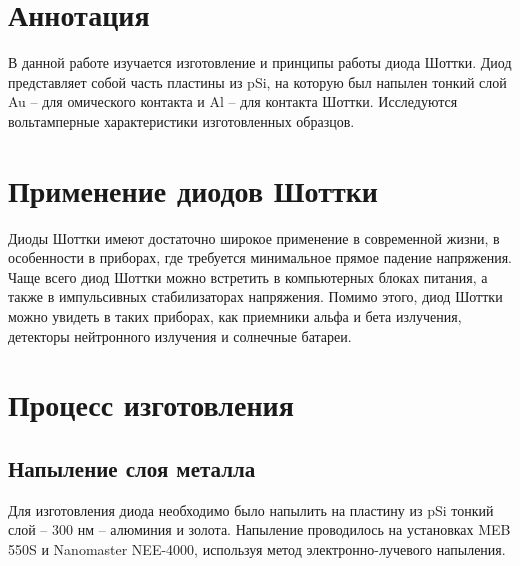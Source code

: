 \documentclass[a4paper,12pt]{article}
\begin{document}
\newpage

\section{Аннотация}
В данной работе изучается изготовление и принципы работы диода Шоттки. Диод представляет собой часть пластины из pSi, на которую был напылен тонкий слой Au -- для омического контакта и Al -- для контакта Шоттки. Исследуются вольтамперные характеристики изготовленных образцов.

\section{Применение диодов Шоттки}

Диоды Шоттки имеют достаточно широкое применение в современной жизни, в особенности в приборах, где требуется минимальное прямое падение напряжения. Чаще всего диод
Шоттки можно встретить в компьютерных блоках питания, а также в импульсивных стабилизаторах напряжения. Помимо этого, диод Шоттки можно увидеть в таких приборах,
как приемники альфа и бета излучения, детекторы нейтронного излучения и солнечные
батареи.

\section{Процесс изготовления}

\subsection{Напыление слоя металла}
Для изготовления диода необходимо было напылить на пластину из pSi тонкий слой -- 300 нм -- алюминия и золота. Напыление проводилось на установках MEB 550S и Nanomaster NEE-4000, используя метод электронно-лучевого напыления.
\end{document}
